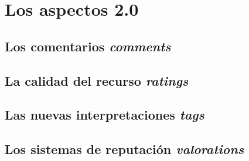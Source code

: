 \chapter{Los aspectos 2.0}

\section{Los comentarios \emph{comments}}
\section{La calidad del recurso \emph{ratings}}
\section{Las nuevas interpretaciones \emph{tags}}
\section{Los sistemas de reputación \emph{valorations}}
